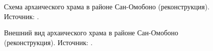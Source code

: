 \begin{appendices}
\begin{figure}[ht!]
\caption{Схема архаического храма в районе Сан-Омобоно (реконструкция). \footnotesize{Источник: \cite[P. 35]{Richardson1992}}. }\label{pic:ArchaicTemple1}
\end{figure}

\begin{figure}[ht!]
\caption{Внешний вид архаического храма в районе Сан-Омобоно (реконструкция). \footnotesize{Источник: \cite[P. 36]{Richardson1992}}. }\label{pic:ArchaicTemple2}
\end{figure}


\end{appendices}
